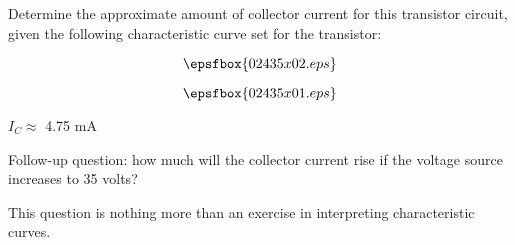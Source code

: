 

Determine the approximate amount of collector current for this transistor circuit, given the following characteristic curve set for the transistor:

$$\epsfbox{02435x02.eps}$$

$$\epsfbox{02435x01.eps}$$







$I_C \approx$ 4.75 mA

\vskip 10pt

Follow-up question: how much will the collector current rise if the voltage source increases to 35 volts?







This question is nothing more than an exercise in interpreting characteristic curves.




